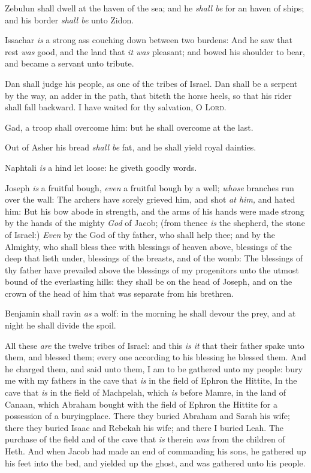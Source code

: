 \documentclass[11pt,letterpaper,oneside]{memoir}
\begin{document}
Zebulun shall dwell at the haven of the sea; and he \emph{shall be} for an
haven of ships; and his border \emph{shall be} unto Zidon.

Issachar \emph{is} a strong ass couching down between two burdens: And
he saw that rest \emph{was} good, and the land that \emph{it was} pleasant;
and bowed his shoulder to bear, and became a servant unto tribute.

Dan shall judge his people, as one of the tribes of Israel. Dan shall be
a serpent by the way, an adder in the path, that biteth the horse heels,
so that his rider shall fall backward. I have waited for thy salvation,
O \textsc{Lord}.

Gad, a troop shall overcome him: but he shall overcome at the last.

Out of Asher his bread \emph{shall be} fat, and he shall yield royal
dainties.

Naphtali \emph{is} a hind let loose: he giveth goodly words.

Joseph \emph{is} a fruitful bough, \emph{even} a fruitful bough by a
well; \emph{whose} branches run over the wall: The archers have sorely
grieved him, and shot \emph{at him,} and hated him: But his bow abode in
strength, and the arms of his hands were made strong by the hands of the
mighty \emph{God} of Jacob; (from thence \emph{is} the shepherd, the
stone of Israel:) \emph{Even} by the God of thy father, who shall help
thee; and by the Almighty, who shall bless thee with blessings of heaven
above, blessings of the deep that lieth under, blessings of the breasts,
and of the womb: The blessings of thy father have prevailed above the
blessings of my progenitors unto the utmost bound of the everlasting
hills: they shall be on the head of Joseph, and on the crown of the head
of him that was separate from his brethren.

Benjamin shall ravin \emph{as} a wolf: in the morning he shall devour
the prey, and at night he shall divide the spoil.

All these \emph{are} the twelve tribes of Israel: and this \emph{is it} that
their father spake unto them, and blessed them; every one according to
his blessing he blessed them. And he charged them, and said unto them, I
am to be gathered unto my people: bury me with my fathers in the cave
that \emph{is} in the field of Ephron the Hittite, In the cave that
\emph{is} in the field of Machpelah, which \emph{is} before Mamre, in
the land of Canaan, which Abraham bought with the field of Ephron the
Hittite for a possession of a buryingplace. There they buried Abraham
and Sarah his wife; there they buried Isaac and Rebekah his wife; and
there I buried Leah. The purchase of the field and of the cave that
\emph{is} therein \emph{was} from the children of Heth. And when Jacob
had made an end of commanding his sons, he gathered up his feet into the
bed, and yielded up the ghost, and was gathered unto his people.
\end{document}
